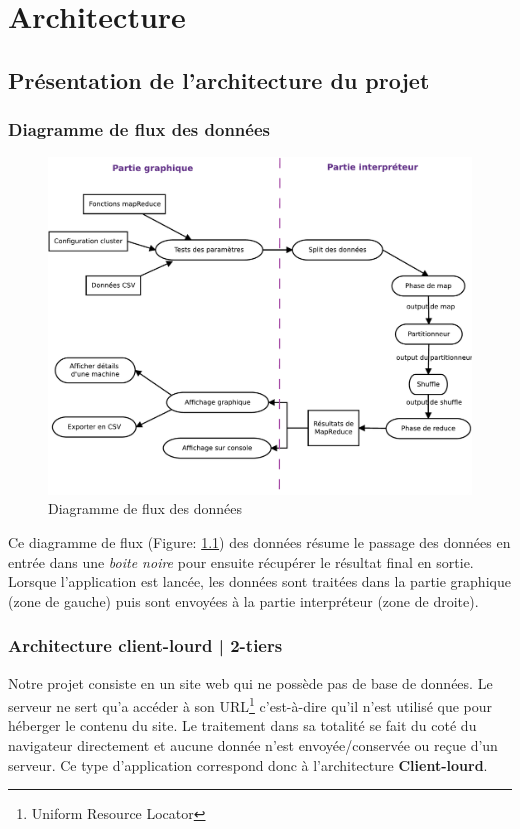 \chapter{Architecture}

\section{Présentation de l'architecture du projet}
\subsection{Diagramme de flux des données}

\begin{figure}[H]
  \centering
    \includegraphics[width=1\textwidth]{diagram/dfd.pdf}
        \caption{Diagramme de flux des données}
        \label{fig:dfd}
\end{figure}
\newpage
Ce diagramme de flux (Figure: \ref{fig:dfd}) des données résume le passage des données en entrée dans une {\it boite noire} pour ensuite récupérer le résultat final en sortie. Lorsque l'application est lancée, les données sont traitées dans la partie graphique (zone de gauche) puis sont envoyées à la partie interpréteur (zone de droite).

\subsection{Architecture client-lourd | 2-tiers}
Notre projet consiste en un site web qui ne possède pas de base de données. Le serveur ne sert qu'a accéder à son URL\footnote{Uniform Resource Locator} c'est-à-dire qu'il n'est utilisé que pour héberger le contenu du site. Le traitement dans sa totalité se fait du coté du navigateur directement et aucune donnée n'est envoyée/conservée ou reçue d'un serveur.
Ce type d'application correspond donc à l'architecture {\bf Client-lourd}.

